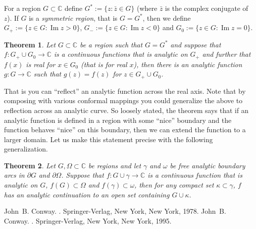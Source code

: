\documentclass[12pt]{article}
\theoremstyle{theorem}
\newtheorem*{thm}{Theorem}
\theoremstyle{definition}
\begin{document}
For a region $G \subset {\mathbb{C}}$ define $G^* := \{ z : \bar{z} \in G \}$ (where $\bar{z}$ is the complex conjugate of $z$).  If $G$ is a {\em symmetric region}, that is $G = G^*$, then we define
$G_+ := \{ z \in G : \operatorname{Im} z > 0 \}$,
$G_- := \{ z \in G : \operatorname{Im} z < 0 \}$ and
$G_0 := \{ z \in G : \operatorname{Im} z = 0 \}$.

\begin{thm}
Let $G \subset {\mathbb{C}}$ be a region such that $G = G^*$ and suppose that
$f \colon G_+ \cup G_0 \to {\mathbb{C}}$ is a continuous functions that is
analytic on $G_+$ and further that $f(x)$ is real for $x \in G_0$ (that is
for real $x$), then there is an analytic function $g : G \to {\mathbb{C}}$
such that $g(z) = f(z)$ for $z \in G_+ \cup G_0$.
\end{thm}

That is you can ``reflect'' an analytic function across the real axis.  Note that by composing with various conformal mappings you could generalize the above to reflection across an analytic curve.
So loosely stated, the theorem says that if an analytic function is defined in a region with some ``nice'' boundary and the function behaves ``nice'' on this boundary, then we can extend the function to a larger domain.  Let us make this statement precise with the following generalization.

\begin{thm}
Let $G, \Omega \subset {\mathbb{C}}$ be regions and let $\gamma$ and $\omega$
be free analytic boundary arcs in $\partial G$ and $\partial \Omega$.  Suppose
that $f \colon G \cup \gamma \to {\mathbb{C}}$ is a continuous function that
is analytic on $G$, $f(G) \subset \Omega$ and $f(\gamma) \subset \omega$, then for any compact set $\kappa \subset \gamma$, $f$ has an analytic continuation to an open set containing $G \cup \kappa$.
\end{thm}

\begin{thebibliography}{9}
John~B. Conway.
{\em {}}.
Springer-Verlag, New York, New York, 1978.
John~B. Conway.
{\em {}}.
Springer-Verlag, New York, New York, 1995.
\end{thebibliography}
\end{document}
